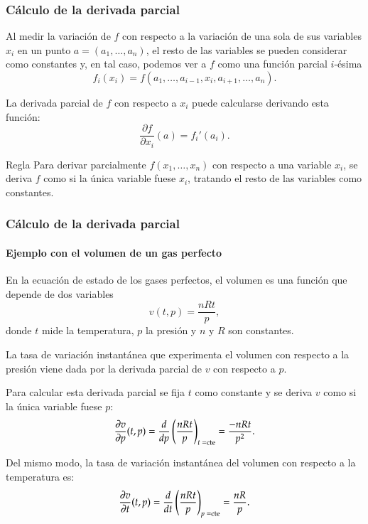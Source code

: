 \begin{frame}
	\frametitle{Cálculo de la derivada parcial}
	Al medir la variación de $f$ con respecto a la variación de una sola de sus variables $x_i$ en un punto
	$a=(a_1,\ldots,a_n)$, el resto de las variables se pueden considerar como constantes y, en tal caso, podemos ver a $f$
	como una función parcial $i$-ésima 
	\[
		f_i(x_i)=f(a_1,\ldots,a_{i-1},x_i,a_{i+1},\ldots,a_n).
	\]
	
	La derivada parcial de $f$ con respecto a $x_i$ puede calcularse derivando esta función:
	\[
		\frac{\partial f}{\partial x_i}(a)=f_i'(a_i).
	\]
	
	\begin{block}{Regla}
		Para derivar parcialmente $f(x_1,\ldots,x_n)$ con respecto a una variable $x_i$, se deriva $f$ como si la única variable
		fuese $x_i$, tratando el resto de las variables como constantes.
	\end{block} 
\end{frame}


\begin{frame}
	\frametitle{Cálculo de la derivada parcial}
	\framesubtitle{Ejemplo con el volumen de un gas perfecto}
	En la ecuación de estado de los gases perfectos, el volumen es una función que depende de dos variables  
	\[v(t,p)=\frac{nRt}{p},\]
	donde $t$ mide la temperatura, $p$ la presión y $n$ y $R$ son constantes.
	
	La tasa de variación instantánea que experimenta el volumen con respecto a la presión viene dada por la derivada parcial de $v$ con respecto a $p$.
	
	Para calcular esta derivada parcial se fija $t$ como constante y se deriva $v$ como si la única variable fuese $p$:
	\[
		\frac{\partial v}{\partial p}(t,p)=\frac{d}{dp}\left(\frac{nRt}{p}\right)_{\mbox{\scriptsize $t=$cte}}=\frac{-nRt}{p^2}.
	\]
	
	Del mismo modo, la tasa de variación instantánea del volumen con respecto a la temperatura es:
	\[
		\frac{\partial v}{\partial t}(t,p)=\frac{d}{dt}\left(\frac{nRt}{p}\right)_{\mbox{\scriptsize$p=$cte}}=\frac{nR}{p}.
	\]
\end{frame}



